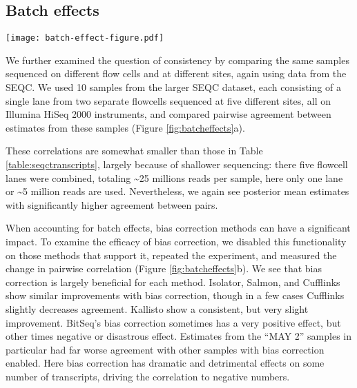 \documentclass[twocolumn]{article}
\begin{document}
\subsection{Batch effects}\label{batch-effects}

\begin{figure*}
\texttt{[image: batch-effect-figure.pdf]}
\caption{
\textbf{a} A heatmap showing pairwise proportionality correlation between the
samples sequenced on two flowcells each at five sites. Flowcells are numbered 1
or 2 and sequencing sites are abbreviated with three letter codes: Australian
Genome Research Facility (AGR), Beijing Genome Institute (BGI), Cornell
University (CNL), Mayo Clinic (MAY), and Novartis (NVS). \textbf{b} The absolute
change in correlation induced by enabling bias correction for methods that
support it. For clarity this plot excludes points for BitSeq estimates of "MAY
2", as bias correction has an extreme detrimental effect on these.}
\label{fig:batcheffects}
\end{figure*}

We further examined the question of consistency by comparing the same
samples sequenced on different flow cells and at different sites, again
using data from the SEQC. We used 10 samples from the larger SEQC
dataset, each consisting of a single lane from two separate
flowcells sequenced at five different sites, all on Illumina HiSeq 2000
instruments, and compared pairwise agreement between estimates from these
samples (Figure \ref{fig:batcheffects}a).

These correlations are somewhat smaller than those in Table
\ref{table:seqctranscripts},
largely because of shallower sequencing: there five flowcell lanes were
combined, totaling \textasciitilde{}25 millions reads per sample, here
only one lane or \textasciitilde{}5 million reads are used.
Nevertheless, we again see posterior mean estimates with significantly higher
agreement between pairs.

When accounting for batch effects, bias correction methods can have a
significant impact. To examine the efficacy of bias correction, we disabled this
functionality on those methods that support it, repeated the experiment, and
measured the change in pairwise correlation (Figure \ref{fig:batcheffects}b). We
see that bias correction is largely beneficial for each method. Isolator,
Salmon, and Cufflinks show similar improvements with bias correction, though in
a few cases Cufflinks slightly decreases agreement. Kallisto show a consistent,
but very slight improvement. BitSeq's bias correction sometimes has a very positive
effect, but other times negative or disastrous effect. Estimates from the ``MAY
2'' samples in particular had far worse agreement with other samples with bias
correction enabled. Here bias correction has dramatic and detrimental effects on
some number of transcripts, driving the correlation to negative numbers.
\end{document}
